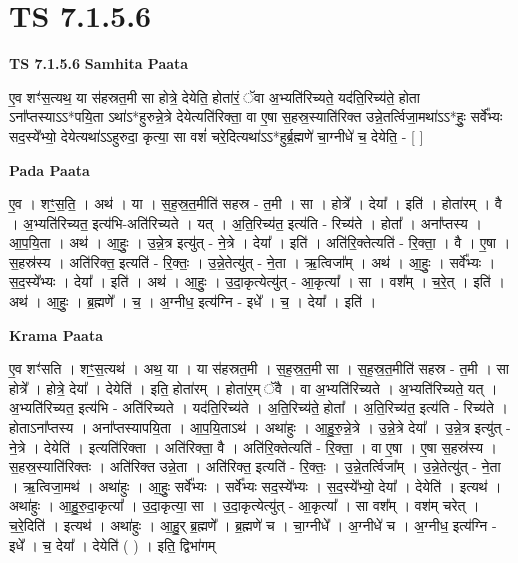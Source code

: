 \documentclass[17pt]{extarticle}
\begin{document}
\section{ TS 7.1.5.6 }

\textbf{TS 7.1.5.6 } \newline
\textbf{Samhita Paata} \newline

ए॒व शꣳ॑स॒त्यथ॒ या स॑हस्रत॒मी सा होत्रे॒ देयेति॒ होता॑रं॒ ॅवा अ॒भ्यति॑रिच्यते॒ यद॑ति॒रिच्य॑ते॒ होता ऽना᳚प्तस्याऽऽ*पयि॒ता ऽथा॑ऽ*हुरुन्ने॒त्रे देयेत्यति॑रिक्ता॒ वा ए॒षा स॒हस्र॒स्याति॑रिक्त उन्ने॒तर्त्विजा॒मथा॑ऽऽ*हुः॒ सर्वे᳚भ्यः सद॒स्ये᳚भ्यो॒ देयेत्यथा॑ऽऽहुरुदा॒ कृत्या॒ सा वशं॑ चरे॒दित्यथा॑ऽऽ*हुर्ब्र॒ह्मणे॑ चा॒ग्नीधे॑ च॒ देयेति॒ - [  ] \newline

\textbf{Pada Paata} \newline

ए॒व । शꣳ॒॒स॒ति॒ । अथ॑ । या । स॒ह॒स्र॒त॒मीति॑ सहस्र - त॒मी । सा । होत्रे᳚ । देया᳚ । इति॑ । होता॑रम् । वै । अ॒भ्यति॑रिच्यत॒ इत्य॑भि-अति॑रिच्यते । यत् । अ॒ति॒रिच्य॑त॒ इत्य॑ति - रिच्य॑ते । होता᳚ । अना᳚प्तस्य । आ॒प॒यि॒ता । अथ॑ । आ॒हुः॒ । उ॒न्ने॒त्र इत्यु॑त् - ने॒त्रे । देया᳚ । इति॑ । अति॑रि॒क्तेत्यति॑ - रि॒क्ता॒ । वै । ए॒षा । स॒हस्र॑स्य । अति॑रिक्त॒ इत्यति॑ - रि॒क्तः॒ । उ॒न्ने॒तेत्यु॑त् - ने॒ता । ऋ॒त्विजा᳚म् । अथ॑ । आ॒हुः॒ । सर्वे᳚भ्यः । स॒द॒स्ये᳚भ्यः । देया᳚ । इति॑ । अथ॑ । आ॒हुः॒ । उ॒दा॒कृत्येत्यु॑त् - आ॒कृत्या᳚ । सा । वश᳚म् । च॒रे॒त् । इति॑ । अथ॑ । आ॒हुः॒ । ब्र॒ह्मणे᳚ । च॒ । अ॒ग्नीध॒ इत्य॑ग्नि - इधे᳚ । च॒ । देया᳚ । इति॑ ।  \newline


\textbf{Krama Paata} \newline

ए॒व शꣳ॑सति । शꣳ॒॒स॒त्यथ॑ । अथ॒ या । या स॑हस्रत॒मी । स॒ह॒स्र॒त॒मी सा । स॒ह॒स्र॒त॒मीति॑ सहस्र - त॒मी । सा होत्रे᳚ । होत्रे॒ देया᳚ । देयेति॑ । इति॒ होता॑रम् । होता॑र॒म् ॅवै । वा अ॒भ्यति॑रिच्यते । अ॒भ्यति॑रिच्यते॒ यत् । अ॒भ्यति॑रिच्यत॒ इत्य॑भि - अति॑रिच्यते । यद॑ति॒रिच्य॑ते । अ॒ति॒रिच्य॑ते॒ होता᳚ । अ॒ति॒रिच्य॑त॒ इत्य॑ति - रिच्य॑ते । होताऽना᳚प्तस्य । अना᳚प्तस्यापयि॒ता । आ॒प॒यि॒ताऽथ॑ । अथा॑हुः । आ॒हु॒रु॒न्ने॒त्रे । उ॒न्ने॒त्रे देया᳚ । उ॒न्ने॒त्र इत्यु॑त् - ने॒त्रे । देयेति॑ । इत्यति॑रिक्ता । अति॑रिक्ता॒ वै । अति॑रि॒क्तेत्यति॑ - रि॒क्ता॒ । वा ए॒षा । ए॒षा स॒हस्र॑स्य । स॒हस्र॒स्याति॑रिक्तः । अति॑रिक्त उन्ने॒ता । अति॑रिक्त॒ इत्यति॑ - रि॒क्तः॒ । उ॒न्ने॒तर्त्विजा᳚म् । उ॒न्ने॒तेत्यु॑त् - ने॒ता । ऋ॒त्विजा॒मथ॑ । अथा॑हुः । आ॒हुः॒ सर्वे᳚भ्यः । सर्वे᳚भ्यः सद॒स्ये᳚भ्यः । स॒द॒स्ये᳚भ्यो॒ देया᳚ । देयेति॑ । इत्यथ॑ । अथा॑हुः । आ॒हु॒रु॒दा॒कृत्या᳚ । उ॒दा॒कृत्या॒ सा । उ॒दा॒कृत्येत्यु॑त् - आ॒कृत्या᳚ । सा वश᳚म् । वश॑म् चरेत् । च॒रे॒दिति॑ । इत्यथ॑ । अथा॑हुः । आ॒हु॒र् ब्र॒ह्मणे᳚ । ब्र॒ह्मणे॑ च । चा॒ग्नीधे᳚ । अ॒ग्नीधे॑ च । अ॒ग्नीध॒ इत्य॑ग्नि - इधे᳚ । च॒ देया᳚ । देयेति॑ ( ) । 
इति॒ द्विभा॑गम् \newline
\end{document}
